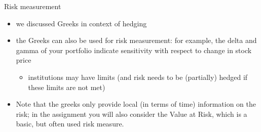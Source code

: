 \documentclass[pdf, handout]{beamer}
\begin{document}
\begin{frame}{Risk measurement}
\begin{itemize}
\item we discussed Greeks in context of hedging
\item the Greeks can also be used for risk measurement: for example,
the delta and gamma of your portfolio indicate sensitivity with 
respect to change in stock price
\begin{itemize}
\item institutions may have limits (and risk needs to be (partially) hedged if these limits are not met)
\end{itemize}
\item Note that the greeks only provide local (in terms of time) information on the risk; in the assignment you will also consider the Value at Risk, which is a basic, but often used risk measure. 
\end{itemize}
\end{frame}
\end{document}

